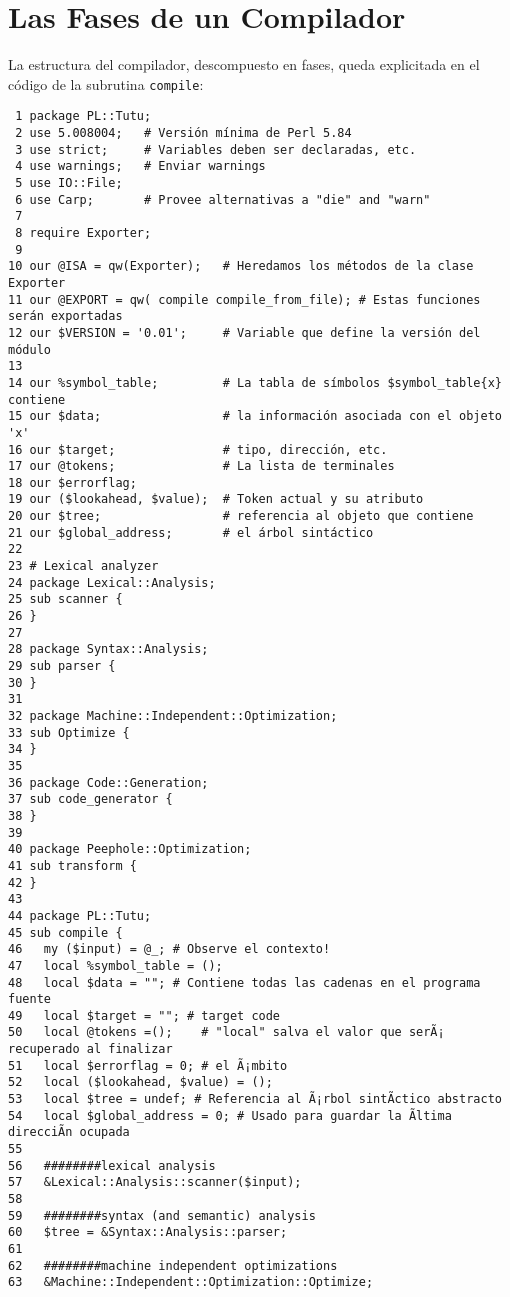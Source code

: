 \section{Las Fases de un Compilador}
\label{section:fases}
La estructura del compilador, descompuesto en fases, queda explicitada 
en el código de la subrutina \verb|compile|:


\begin{verbatim}
 1 package PL::Tutu;
 2 use 5.008004;   # Versión mínima de Perl 5.84
 3 use strict;     # Variables deben ser declaradas, etc.
 4 use warnings;   # Enviar warnings
 5 use IO::File;
 6 use Carp;       # Provee alternativas a "die" and "warn" 
 7 
 8 require Exporter;
 9 
10 our @ISA = qw(Exporter);   # Heredamos los métodos de la clase Exporter
11 our @EXPORT = qw( compile compile_from_file); # Estas funciones serán exportadas
12 our $VERSION = '0.01';     # Variable que define la versión del módulo
13 
14 our %symbol_table;         # La tabla de símbolos $symbol_table{x} contiene
15 our $data;                 # la información asociada con el objeto 'x'
16 our $target;               # tipo, dirección, etc.
17 our @tokens;               # La lista de terminales
18 our $errorflag;
19 our ($lookahead, $value);  # Token actual y su atributo
20 our $tree;                 # referencia al objeto que contiene
21 our $global_address;       # el árbol sintáctico
22 
23 # Lexical analyzer 
24 package Lexical::Analysis;
25 sub scanner {
26 }
27 
28 package Syntax::Analysis;
29 sub parser {
30 }
31 
32 package Machine::Independent::Optimization;
33 sub Optimize {
34 }
35 
36 package Code::Generation;
37 sub code_generator {
38 }
39   
40 package Peephole::Optimization;
41 sub transform {
42 }
43 
44 package PL::Tutu;
45 sub compile {
46   my ($input) = @_; # Observe el contexto!
47   local %symbol_table = (); 
48   local $data = ""; # Contiene todas las cadenas en el programa fuente
49   local $target = ""; # target code
50   local @tokens =();    # "local" salva el valor que serÃ¡ recuperado al finalizar
51   local $errorflag = 0; # el Ã¡mbito
52   local ($lookahead, $value) = ();
53   local $tree = undef; # Referencia al Ã¡rbol sintÃctico abstracto 
54   local $global_address = 0; # Usado para guardar la Ãltima direcciÃn ocupada
55   
56   ########lexical analysis
57   &Lexical::Analysis::scanner($input);
58 
59   ########syntax (and semantic) analysis
60   $tree = &Syntax::Analysis::parser;
61 
62   ########machine independent optimizations
63   &Machine::Independent::Optimization::Optimize;

\end{verbatim}
